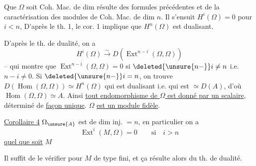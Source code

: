 Que $\Omega$ soit Coh. Mac. de dim résulte des
formules précédentes et de la caractérisation des modules
de Coh. Mac. de dim $n$. Il s'ensuit
$H^i(\Omega)=0$ pour $i<n$,  D'après le th. 1,
le cor. 1 implique que $H^n(\Omega)$ est dualisant.

D'après le th. de dualité, on a
\[
H^i(\Omega)\xrightarrow{\sim}D(\operatorname{Ext}^{n-i}(\Omega,\Omega))
\]
-- qui montre que 
$\operatorname{Ext}^{n-i}(\Omega,\Omega)=0$ si $\deleted{\unsure{n-}}i\ne n$ i.e. $n-i\ne0$.
 Si $\deleted{\unsure{n-}}i=n$, on
trouve $D(\operatorname{Hom}(\Omega,\Omega))\simeq H^n(\Omega)$ qui est
dualisant i.e. qui est $\simeq D(A)$, d'où
$\operatorname{Hom}(\Omega,\Omega)\simeq A$. Ainsi \uline{tout endomorphisme
de $\Omega$ est donné par un scalaire}, déterminé de
\uline{façon unique}.  $\Omega$ \uline{est  un module fidèle}.

\uline{Corollaire 4}  $\Omega_{\unsure{A}}$ est de dim inj. $=n$, en
particulier on a
\[
\operatorname{Ext}^i(M,\Omega)=0\qquad\text{si}\quad i>n
\]
\uline{quel que soit} $M$

Il suffit de le vérifier pour $M$ de
type fini, et ça résulte alors du th. de dualité.


